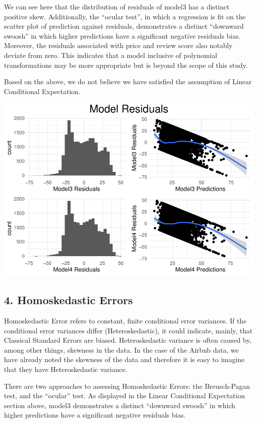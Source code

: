 \documentclass[
]{article}
\begin{document}
We can see here that the distribution of residuals of model3 has a distinct positive skew. Additionally, the ``ocular test'', in which a regression is fit on the scatter plot of prediction against residuals, demonstrates a distinct ``downward swoosh'' in which higher predictions have a significant negative residuals bias. Moreover, the residuals associated with price and review score also notably deviate from zero. This indicates that a model inclusive of polynomial transformations may be more appropriate but is beyond the scope of this study.

Based on the above, we do not believe we have satisfied the assumption of Linear Conditional Expectation.

\includegraphics{lab2_report_files/figure-latex/lce_charts-1.pdf}

\hypertarget{homoskedastic-errors}{%
\subsection{\texorpdfstring{\textbf{4. Homoskedastic Errors}}{4. Homoskedastic Errors}}\label{homoskedastic-errors}}

Homoskedastic Error refers to constant, finite conditional error variances. If the conditional error variances differ (Heteroskedastic), it could indicate, mainly, that Classical Standard Errors are biased. Heteroskedastic variance is often caused by, among other things, skewness in the data.
In the case of the Airbnb data, we have already noted the skewness of the data and therefore it is easy to imagine that they have Heteroskedastic variance.

There are two approaches to assessing Homoskedastic Errors: the Breusch-Pagan test, and the ``ocular'' test. As displayed in the Linear Conditional Expectation section above, model3 demonstrates a distinct ``downward swoosh'' in which higher predictions have a significant negative residuals bias.
\end{document}
